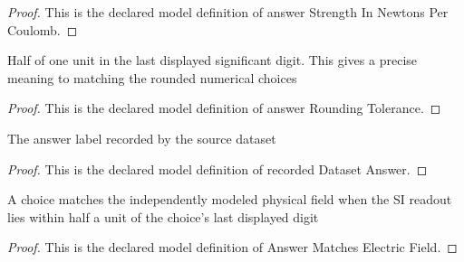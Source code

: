 \begin{proof}
  This is the declared model definition of answer Strength In Newtons Per Coulomb.
\end{proof}
\begin{definition}
  \label{def:physics:phyx-mini-0836:phyxminiproblems-problemphyxmini0836-answerroundingtolerance}
  Half of one unit in the last displayed significant digit. This gives a precise meaning to matching the rounded numerical choices
\end{definition}
\begin{proof}
  This is the declared model definition of answer Rounding Tolerance.
\end{proof}
\begin{definition}
  \label{def:physics:phyx-mini-0836:phyxminiproblems-problemphyxmini0836-recordeddatasetanswer}
  The answer label recorded by the source dataset
\end{definition}
\begin{proof}
  This is the declared model definition of recorded Dataset Answer.
\end{proof}
\begin{definition}
  \label{def:physics:phyx-mini-0836:phyxminiproblems-problemphyxmini0836-answermatcheselectricfield}
  A choice matches the independently modeled physical field when the SI readout lies within half a unit of the choice's last displayed digit
\end{definition}
\begin{proof}
  This is the declared model definition of Answer Matches Electric Field.
\end{proof}
